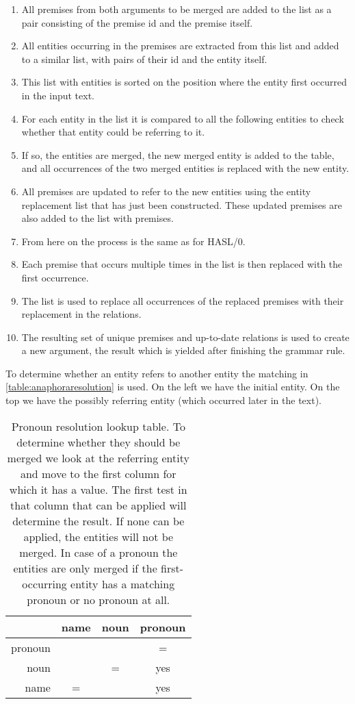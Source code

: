 \begin{enumerate}
    \item All premises from both arguments to be merged are added to the list as a pair consisting of the premise id and the premise itself.
    \item All entities occurring in the premises are extracted from this list and added to a similar list, with pairs of their id and the entity itself.
    \item This list with entities is sorted on the position where the entity first occurred in the input text.
    \item For each entity in the list it is compared to all the following entities to check whether that entity could be referring to it.
    \item If so, the entities are merged, the new merged entity is added to the table, and all occurrences of the two merged entities is replaced with the new entity.
    \item All premises are updated to refer to the new entities using the entity replacement list that has just been constructed. These updated premises are also added to the list with premises. 
    \item From here on the process is the same as for HASL/0.
    \item Each premise that occurs multiple times in the list is then replaced with the first occurrence.
    \item The list is used to replace all occurrences of the replaced premises with their replacement in the relations.
    \item The resulting set of unique premises and up-to-date relations is used to create a new argument, the result which is yielded after finishing the grammar rule.
\end{enumerate}

To determine whether an entity refers to another entity the matching in \autoref{table:anaphoraresolution} is used. On the left we have the initial entity. On the top we have the possibly referring entity (which occurred later in the text).

\begin{table}
    \begin{tabular}{r|ccc|}
                & name  & noun  & pronoun \\
        \hline
        pronoun &       &       & =  \\
        noun    &       & =     & yes \\
        name    & =     &       & yes \\
        \hline
    \end{tabular}
    \caption{Pronoun resolution lookup table. To determine whether they should be merged we look at the referring entity and move to the first column for which it has a value. The first test in that column that can be applied will determine the result. If none can be applied, the entities will not be merged. In case of a pronoun the entities are only merged if the first-occurring entity has a matching pronoun or no pronoun at all.}
    \label{table:anaphoraresolution}
\end{table}

